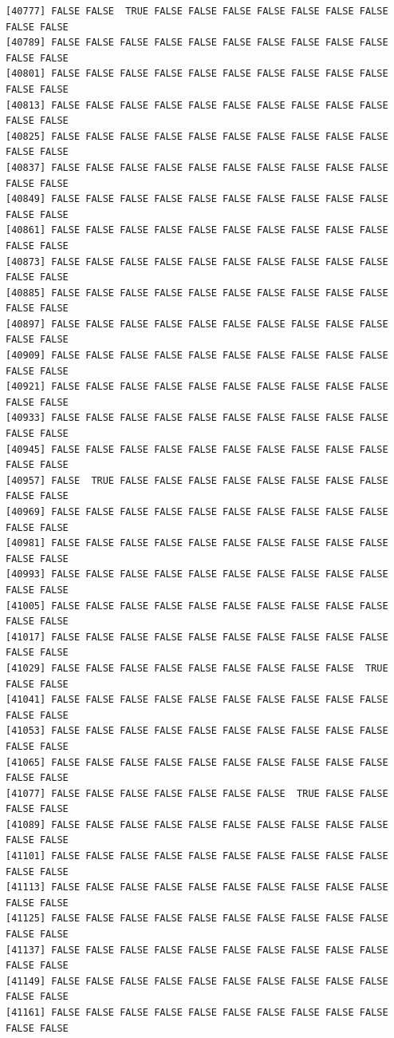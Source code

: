 \documentclass[
  a4paper,
  DIV=11,
  numbers=noendperiod]{scrartcl}
\begin{document}
\begin{verbatim}
[40777] FALSE FALSE  TRUE FALSE FALSE FALSE FALSE FALSE FALSE FALSE FALSE FALSE
[40789] FALSE FALSE FALSE FALSE FALSE FALSE FALSE FALSE FALSE FALSE FALSE FALSE
[40801] FALSE FALSE FALSE FALSE FALSE FALSE FALSE FALSE FALSE FALSE FALSE FALSE
[40813] FALSE FALSE FALSE FALSE FALSE FALSE FALSE FALSE FALSE FALSE FALSE FALSE
[40825] FALSE FALSE FALSE FALSE FALSE FALSE FALSE FALSE FALSE FALSE FALSE FALSE
[40837] FALSE FALSE FALSE FALSE FALSE FALSE FALSE FALSE FALSE FALSE FALSE FALSE
[40849] FALSE FALSE FALSE FALSE FALSE FALSE FALSE FALSE FALSE FALSE FALSE FALSE
[40861] FALSE FALSE FALSE FALSE FALSE FALSE FALSE FALSE FALSE FALSE FALSE FALSE
[40873] FALSE FALSE FALSE FALSE FALSE FALSE FALSE FALSE FALSE FALSE FALSE FALSE
[40885] FALSE FALSE FALSE FALSE FALSE FALSE FALSE FALSE FALSE FALSE FALSE FALSE
[40897] FALSE FALSE FALSE FALSE FALSE FALSE FALSE FALSE FALSE FALSE FALSE FALSE
[40909] FALSE FALSE FALSE FALSE FALSE FALSE FALSE FALSE FALSE FALSE FALSE FALSE
[40921] FALSE FALSE FALSE FALSE FALSE FALSE FALSE FALSE FALSE FALSE FALSE FALSE
[40933] FALSE FALSE FALSE FALSE FALSE FALSE FALSE FALSE FALSE FALSE FALSE FALSE
[40945] FALSE FALSE FALSE FALSE FALSE FALSE FALSE FALSE FALSE FALSE FALSE FALSE
[40957] FALSE  TRUE FALSE FALSE FALSE FALSE FALSE FALSE FALSE FALSE FALSE FALSE
[40969] FALSE FALSE FALSE FALSE FALSE FALSE FALSE FALSE FALSE FALSE FALSE FALSE
[40981] FALSE FALSE FALSE FALSE FALSE FALSE FALSE FALSE FALSE FALSE FALSE FALSE
[40993] FALSE FALSE FALSE FALSE FALSE FALSE FALSE FALSE FALSE FALSE FALSE FALSE
[41005] FALSE FALSE FALSE FALSE FALSE FALSE FALSE FALSE FALSE FALSE FALSE FALSE
[41017] FALSE FALSE FALSE FALSE FALSE FALSE FALSE FALSE FALSE FALSE FALSE FALSE
[41029] FALSE FALSE FALSE FALSE FALSE FALSE FALSE FALSE FALSE  TRUE FALSE FALSE
[41041] FALSE FALSE FALSE FALSE FALSE FALSE FALSE FALSE FALSE FALSE FALSE FALSE
[41053] FALSE FALSE FALSE FALSE FALSE FALSE FALSE FALSE FALSE FALSE FALSE FALSE
[41065] FALSE FALSE FALSE FALSE FALSE FALSE FALSE FALSE FALSE FALSE FALSE FALSE
[41077] FALSE FALSE FALSE FALSE FALSE FALSE FALSE  TRUE FALSE FALSE FALSE FALSE
[41089] FALSE FALSE FALSE FALSE FALSE FALSE FALSE FALSE FALSE FALSE FALSE FALSE
[41101] FALSE FALSE FALSE FALSE FALSE FALSE FALSE FALSE FALSE FALSE FALSE FALSE
[41113] FALSE FALSE FALSE FALSE FALSE FALSE FALSE FALSE FALSE FALSE FALSE FALSE
[41125] FALSE FALSE FALSE FALSE FALSE FALSE FALSE FALSE FALSE FALSE FALSE FALSE
[41137] FALSE FALSE FALSE FALSE FALSE FALSE FALSE FALSE FALSE FALSE FALSE FALSE
[41149] FALSE FALSE FALSE FALSE FALSE FALSE FALSE FALSE FALSE FALSE FALSE FALSE
[41161] FALSE FALSE FALSE FALSE FALSE FALSE FALSE FALSE FALSE FALSE FALSE FALSE

\end{verbatim}
\end{document}
